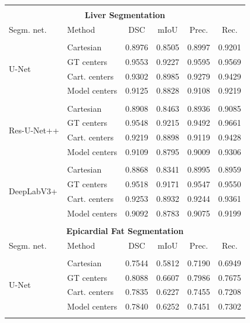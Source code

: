 \begin{table}
\ContinuedFloat
\centering
\def\arraystretch{1.25}
\begin{tabular}{l l c c c c} 
 \hline \\ [-2ex]
\multicolumn{6}{c}{\textbf{Liver Segmentation}}\\[1ex]
 \hline
 Segm. net. & Method & DSC & mIoU & Prec. & Rec. \\ 
 \hline \\ [-1.5ex]
 \multirow{4}{7em}{{U-Net}}
& Cartesian & 0.8976 & 0.8505 & 0.8997 & 0.9201 \\
& GT centers & 0.9553 & 0.9227 & 0.9595 & 0.9569 \\
& Cart. centers & 0.9302 & 0.8985 & 0.9279 & 0.9429 \\
& Model centers & 0.9125 & 0.8828 & 0.9108 & 0.9219 \\ [1ex]
\hline \\ [-1.5ex]

 \multirow{4}{7em}{{Res-U-Net++}}
& Cartesian & 0.8908 & 0.8463 & 0.8936 & 0.9085 \\
& GT centers & 0.9548 & 0.9215 & 0.9492 & 0.9661 \\
& Cart. centers & 0.9219 & 0.8898 & 0.9119 & 0.9428 \\
& Model centers & 0.9109 & 0.8795 & 0.9009 & 0.9306 \\ [1ex]
\hline \\ [-1.5ex]

 \multirow{4}{7em}{{DeepLabV3+}}
& Cartesian & 0.8868 & 0.8341 & 0.8995 & 0.8959 \\
& GT centers & 0.9518 & 0.9171 & 0.9547 & 0.9550 \\
& Cart. centers & 0.9253 & 0.8932 & 0.9244 & 0.9361 \\
& Model centers & 0.9092 & 0.8783 & 0.9075 & 0.9199 \\ [1ex]
\hline \\ [-1.5ex]

\multicolumn{6}{c}{\textbf{Epicardial Fat Segmentation}}\\[1ex]
 \hline
 Segm. net. & Method & DSC & mIoU & Prec. & Rec. \\ 
 \hline \\ [-1.5ex]
 \multirow{4}{7em}{{U-Net}}
& Cartesian & 0.7544 & 0.5812 & 0.7190 & 0.6949 \\
& GT centers & 0.8088 & 0.6607 & 0.7986 & 0.7675 \\
& Cart. centers & 0.7835 & 0.6227 & 0.7455 & 0.7208 \\
& Model centers & 0.7840 & 0.6252 & 0.7451 & 0.7302 \\ [1ex]
\hline \\ [-1.5ex]


\end{tabular}
\end{table}
